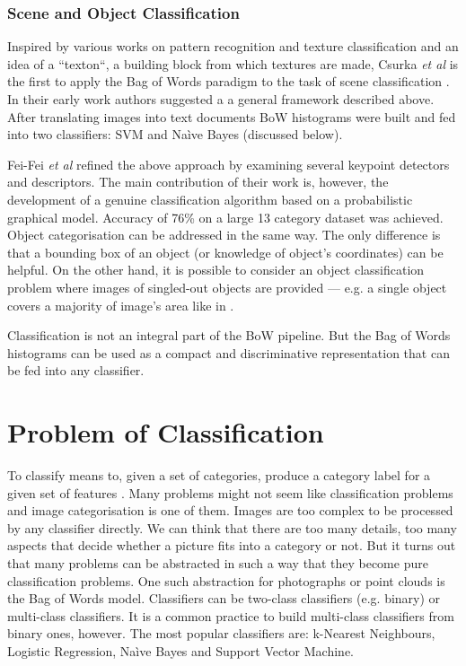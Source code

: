 		\subsubsection{Scene and Object Classification}
		Inspired by various works on pattern recognition and texture classification and an idea of a ``texton``, a building block from which textures are made, Csurka \emph{et al} is the first to apply the Bag of Words paradigm to the task of scene classification \cite{csurka2004visual}. In their early work authors suggested a a general framework described above. After translating images into text documents BoW histograms were built and fed into two classifiers: SVM and Na\`ive Bayes (discussed below). 		

		Fei-Fei \emph{et al} refined the above approach by examining several keypoint detectors and descriptors. The main contribution of their work is, however, the development of a genuine classification algorithm based on a probabilistic graphical model. Accuracy of 76\% on a large 13 category dataset was achieved.
		Object categorisation can be addressed in the same way. The only difference is that a bounding box of an object (or knowledge of object's coordinates) can be helpful. On the other hand, it is possible to consider an object classification problem where images of singled-out objects are provided --- e.g. a single object covers a majority of image's area like in \cite{zhangcategory}.

		Classification is not an integral part of the BoW pipeline. But the Bag of Words histograms can be used as a compact and discriminative representation that can be fed into any classifier.
		
\section{Problem of Classification}

	
	To classify means to, given a set of categories, produce a category label for a given set of features \cite{ponce2011cv}. Many problems might not seem like classification problems and image categorisation is one of them. Images are too complex to be processed by any classifier directly. We can think that there are too many details, too many aspects that decide whether a picture fits into a category or not. But it turns out that many problems can be abstracted in such a way that they become pure classification problems. One such abstraction for photographs or point clouds is the Bag of Words model. Classifiers can be two-class classifiers (e.g. binary) or multi-class classifiers. It is a common practice to build multi-class classifiers from binary ones, however. The most popular classifiers are: k-Nearest Neighbours, Logistic Regression, Na\`ive Bayes and Support Vector Machine.
	
